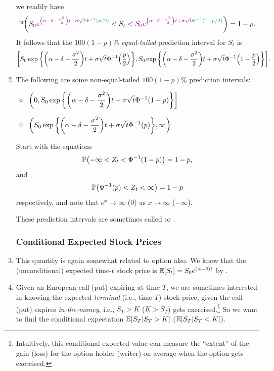 \begin{enumerate}
\[\]
we readily have
\[
\mathbb{P}\qty(
{\color{violet}S_0e^{\qty(\alpha-\delta-\frac{\sigma^2}{2})t+\sigma\sqrt{t}{\color{teal}\Phi^{-1}(p/2)}}}
<S_t<
{\color{violet}S_0e^{\qty(\alpha-\delta-\frac{\sigma^2}{2})t+\sigma\sqrt{t}{\color{teal}\Phi^{-1}(1-p/2)}}}
)=1-p.
\]
It follows that the \(100(1-p)\)\% \emph{equal-tailed} prediction interval for
\(S_t\) is
\[
\qty[
S_0\exp\qty{\qty(\alpha-\delta-\frac{\sigma^2}{2})t+\sigma\sqrt{t}\Phi^{-1}\qty(\frac{p}{2})},
S_0\exp\qty{\qty(\alpha-\delta-\frac{\sigma^2}{2})t+\sigma\sqrt{t}\Phi^{-1}\qty(1-\frac{p}{2})}
].
\]
\item The following are some non-equal-tailed \(100(1-p)\)\% prediction
intervals:
\begin{itemize}
\item \(\displaystyle \left(0,S_0\exp\qty{\qty(\alpha-\delta-\frac{\sigma^2}{2})t+\sigma\sqrt{t}\Phi^{-1}(1-p)}\right]\)
\item \(\displaystyle \qty(S_0\exp\qty{\qty(\alpha-\delta-\frac{\sigma^2}{2})t+\sigma\sqrt{t}\Phi^{-1}(p)},\infty)\)
\end{itemize}
\begin{pf}
Start with the equations
\[
\mathbb{P}\qty(-\infty<Z_t<\Phi^{-1}(1-p))=1-p,
\]
and
\[
\mathbb{P}\qty(\Phi^{-1}(p)<Z_t<\infty)=1-p
\]
respectively, and note that \(e^{x}\to \infty\) (\(0\)) as \(x\to
\infty\) (\(-\infty\)).
\end{pf}

These prediction intervals are sometimes called  or
.
\subsubsection*{Conditional Expected Stock Prices}
\item \label{it:bs-exp-stock-price}
This quantity is again somewhat related to option also. We know that the
(unconditional) expected time-\(t\) stock price is
\(\mathbb{E}\qty[S_t]=S_0e^{(\alpha-\delta)t}\) by .

\item Given an European call (put) expiring at time \(T\), we are sometimes
interested in knowing the expected \emph{terminal} (i.e., time-\(T\)) stock
price, given the call (put) expires \emph{in-the-money}, i.e., \(S_T>K\)
(\(K>S_T\))  gets exercised.\footnote{Intuitively, this
conditional expected value can measure the ``extent'' of the gain (loss) for
the option holder (writer) on average when the option gets exercised.} So we
want to find the conditional expectation \(\mathbb{E}\qty[S_T|S_T>K]\)
(\(\mathbb{E}\qty[S_T|S_T<K]\)).


\end{enumerate}
